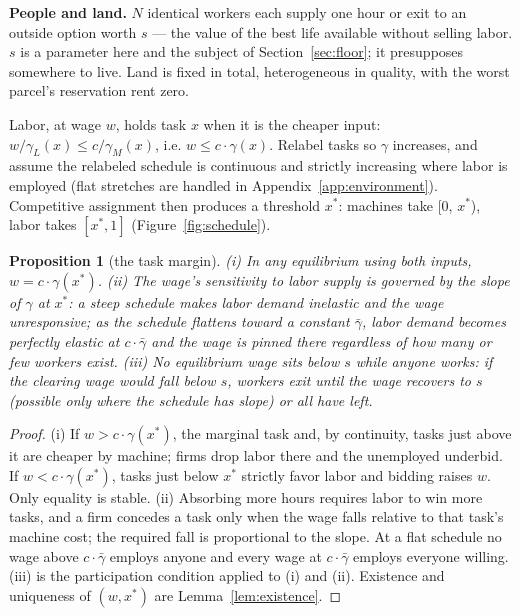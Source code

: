 \documentclass[12pt]{article}
\theoremstyle{plain}
\newtheorem{proposition}{Proposition}
\begin{document}
\textbf{People and land.} $N$ identical workers each supply one hour or exit to an outside option worth $s$ --- the value of the best life available without selling labor. $s$ is a parameter here and the subject of Section~\ref{sec:floor}; it presupposes somewhere to live. Land is fixed in total, heterogeneous in quality, with the worst parcel's reservation rent zero.

Labor, at wage $w$, holds task $x$ when it is the cheaper input: $w/\gamma _L(x) \le c/\gamma _M(x)$, i.e. $w \le c\cdot \gamma (x)$. Relabel tasks so $\gamma$ increases, and assume the relabeled schedule is continuous and strictly increasing where labor is employed (flat stretches are handled in Appendix~\ref{app:environment}). Competitive assignment then produces a threshold $x^*$: machines take [0, $x^*$), labor takes $[x^*, 1]$ (Figure~\ref{fig:schedule}).

\begin{proposition}[the task margin]\label{prop:margin}
(i) In any equilibrium using both inputs, $w = c\cdot \gamma (x^*)$. (ii) The wage's sensitivity to labor supply is governed by the slope of $\gamma$ at $x^*$: a steep schedule makes labor demand inelastic and the wage unresponsive; as the schedule flattens toward a constant $\bar{\gamma}$, labor demand becomes perfectly elastic at $c\cdot \bar{\gamma}$ and the wage is pinned there regardless of how many or few workers exist. (iii) No equilibrium wage sits below $s$ while anyone works: if the clearing wage would fall below $s$, workers exit until the wage recovers to $s$ (possible only where the schedule has slope) or all have left.
\end{proposition}

\begin{proof}
(i) If $w > c\cdot \gamma (x^*)$, the marginal task and, by continuity, tasks just above it are cheaper by machine; firms drop labor there and the unemployed underbid. If $w < c\cdot \gamma (x^*)$, tasks just below $x^*$ strictly favor labor and bidding raises $w$. Only equality is stable. (ii) Absorbing more hours requires labor to win more tasks, and a firm concedes a task only when the wage falls relative to that task's machine cost; the required fall is proportional to the slope. At a flat schedule no wage above $c\cdot \bar{\gamma}$ employs anyone and every wage at $c\cdot \bar{\gamma}$ employs everyone willing. (iii) is the participation condition applied to (i) and (ii). Existence and uniqueness of $(w, x^*)$ are Lemma~\ref{lem:existence}.
\end{proof}
\end{document}
